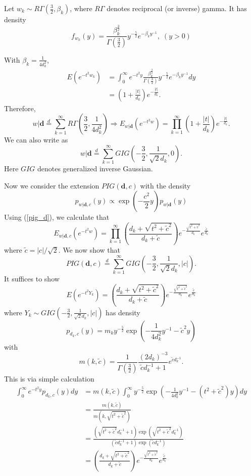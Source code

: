 \documentclass[11pt, oneside]{article}
\newcommand{\dd}{\mathbf{d}}
\begin{document}
Let $w_k \sim R\Gamma(\frac{3}{2}, \beta_k)$, where $R\Gamma$ denotes reciprocal (or inverse) gamma. It has density 
$$
f_{w_k}(y) = \frac{\beta_k^{\frac{3}{2}}}{\Gamma(\frac{3}{2})}  y^{-\frac{5}{2}} e^{-\beta_k y^{-1}}, \; (y>0)
$$

With $\beta_k = \frac{1}{4d_k^2}$, 
\begin{align}
E(e^{-t^2 w_k}) &= \int_0^\infty e^{-t^2 y}  \frac{\beta_k^{\frac{3}{2}}}{\Gamma(\frac{3}{2})}  y^{-\frac{5}{2}} e^{-\beta_k y^{-1}} dy\\
&=  \left( 1 + \frac{|t|}{d_k} \right) e^{-\frac{|t|}{d_k}}.
\end{align}
Therefore, 
\begin{equation}\label{pig_d}
w|\dd \overset{d}{=} \sum_{k=1}^\infty R\Gamma\left(\frac{3}{2}, \frac{1}{4d_k^2}\right)
 \Longrightarrow E_{w|\dd}(e^{-t^2 w}) = \prod_{k=1}^\infty \left( 1 + \frac{|t|}{d_k} \right) e^{-\frac{|t|}{d_k}}.
\end{equation}
We can also write as 
$$
w |\dd \overset{d}{=}  \sum_{k=1}^\infty GIG\left(-\frac{3}{2}, \frac{1}{\sqrt{2}d_k}, 0\right).
$$ 
Here $GIG$ denotes generalized inverse Gaussian. 

Now we consider the extension $PIG(\dd, c)$ with the density
$$
p_{w|\dd, c} (y) \propto \exp\left( -\frac{c^2}{2} y \right) p_{w|\dd}(y)
$$
Using (\ref{pig_d}), we calculate that 
\begin{equation}
E_{w|\dd, c}(e^{-t^2 w}) = \prod_{k=1}^\infty \left( \frac{d_k + \sqrt{t^2 + \tilde{c}^2}}{d_k + \tilde{c}} \right) e^{-\frac{\sqrt{t^2 + \tilde{c}^2}}{d_k}} e^{\frac{\tilde c}{d_k}} 
\end{equation}
where $\tilde{c} = |c|/\sqrt{2}$. We now show that 
$$
PIG(\dd, c) \overset{d}{=} \sum_{k=1}^\infty GIG\left(-\frac{3}{2}, \frac{1}{\sqrt{2}d_k}, |c|\right).
$$
It suffices to show 
$$
E(e^{-t^2 Y_k}) = \left( \frac{d_k + \sqrt{t^2 + \tilde{c}^2}}{d_k + \tilde{c}} \right) e^{-\frac{\sqrt{t^2 + \tilde{c}^2}}{d_k}} e^{\frac{\tilde c}{d_k}} 
$$
where $Y_k \sim GIG\left(-\frac{3}{2}, \frac{1}{\sqrt{2}d_k}, |c|\right)$ has density
$$
p_{d_k, c}(y) = m_k y^{-\frac{5}{2}} \exp\left(-\frac{1}{4d_k^2} y^{-1} -\tilde{c}^2 y\right)
$$ with $$m(k, \tilde{c}) = \frac{1}{\Gamma\left(\frac{3}{2}\right)}\frac{ (2d_k)^{-3}}{\tilde{c} d_k^{-1} +1}e^{\tilde{c} d_k^{-1}}.$$ This is via simple calculation 
\begin{align*}
\int_0^\infty e^{-t^2 y} p_{d_k, c}(y) dy &= m(k, \tilde{c}) \int_0^\infty  y^{-\frac{5}{2}} \exp\left(-\frac{1}{4d_k^2} y^{-1} -(t^2 + \tilde{c}^2) y\right) dy\\
&= \frac{m(k, \tilde{c})}{m(k, \sqrt{t^2 + \tilde{c}^2})}\\
&= \frac{(\sqrt{t^2 + \tilde{c}^2} d_k^{-1} +1) \exp(\sqrt{t^2 + \tilde{c}^2} d_k^{-1})}{(\tilde{c} d_k^{-1} +1)\exp(\tilde{c} d_k^{-1})}\\
&=  \left( \frac{d_k + \sqrt{t^2 + \tilde{c}^2}}{d_k + \tilde{c}} \right) e^{-\frac{\sqrt{t^2 + \tilde{c}^2}}{d_k}} e^{\frac{\tilde c}{d_k}}  
\end{align*}
\end{document}
